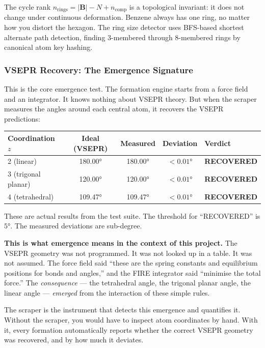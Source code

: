 \documentclass[11pt, a4paper, oneside]{article}
\theoremstyle{definition}
\theoremstyle{remark}
\begin{document}
The cycle rank $n_{\text{rings}} = |\mathbf{B}| - N + n_{\text{comp}}$
is a topological invariant: it does not change under continuous
deformation.  Benzene always has one ring, no matter how you distort
the hexagon.  The ring size detector uses BFS-based shortest
alternate path detection, finding 3-membered through 8-membered rings
by canonical atom key hashing.

\subsubsection{VSEPR Recovery: The Emergence Signature}

This is the core emergence test.  The formation engine starts from a
force field and an integrator.  It knows nothing about VSEPR theory.
But when the scraper measures the angles around each central atom,
it recovers the VSEPR predictions:

\begin{center}
\begin{tabular}{lcccl}
\toprule
Coordination $z$ & Ideal (VSEPR) & Measured & Deviation & Verdict \\
\midrule
2 (linear) & 180.00° & 180.00° & $<0.01°$ & \textbf{RECOVERED} \\
3 (trigonal planar) & 120.00° & 120.00° & $<0.01°$ & \textbf{RECOVERED} \\
4 (tetrahedral) & 109.47° & 109.47° & $<0.01°$ & \textbf{RECOVERED} \\
\bottomrule
\end{tabular}
\end{center}

These are actual results from the test suite.  The threshold for
``RECOVERED'' is $5°$.  The measured deviations are sub-degree.

\textbf{This is what emergence means in the context of this project.}
The VSEPR geometry was not programmed.  It was not looked up in a
table.  It was not assumed.  The force field said ``these are the
spring constants and equilibrium positions for bonds and angles,''
and the FIRE integrator said ``minimise the total force.''  The
\textit{consequence} — the tetrahedral angle, the trigonal planar
angle, the linear angle — \textit{emerged} from the interaction
of these simple rules.

The scraper is the instrument that detects this emergence and
quantifies it.  Without the scraper, you would have to inspect atom
coordinates by hand.  With it, every formation automatically reports
whether the correct VSEPR geometry was recovered, and by how much
it deviates.
\end{document}
